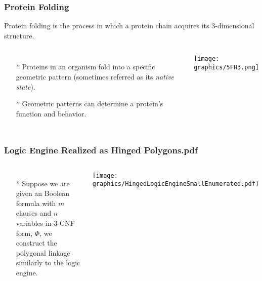 \documentclass{beamer}
\begin{document}
\begin{frame}
  \frametitle{Protein Folding}
  Protein folding is the process in which a protein chain acquires its 3-dimensional structure.
  \begin{columns}[c] %
   \begin{itemize}
    \item[*] Proteins in an organism fold into a specific geometric pattern (sometimes referred as its \textit{native state}).
    \item[*]  Geometric patterns can determine a protein's function and behavior.
   \end{itemize}
     \begin{minipage}{\linewidth}
    \begin{center}
    \texttt{[image: graphics/5FH3.png]}
    \end{center}
  \end{minipage}
  \end{columns}
\end{frame}

\begin{frame} \frametitle{Logic Engine Realized as Hinged Polygons.pdf}
    \begin{columns}[c]
        \begin{itemize}
            \item[*] Suppose we are given an Boolean formula with $m$ clauses and $n$ variables in 3-CNF form, $\Phi$, we construct the polygonal linkage similarly to the logic engine.
        \end{itemize}
        \begin{minipage}{\linewidth}
            \begin{center}
            \texttt{[image: graphics/HingedLogicEngineSmallEnumerated.pdf]}
            \label{gfx:HingedLogicEngineSmallEnumerated.pdf}
            \end{center}
        \end{minipage}
    \end{columns}
\end{frame}
\end{document}
